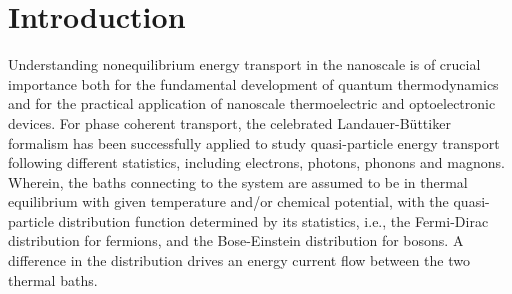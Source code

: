\documentclass[aps,prb,
,floatfix,footinbib,shortbibliography,
preprint
]{revtex4-1}
\begin{document}
\maketitle


\section{Introduction}
Understanding nonequilibrium energy transport in the nanoscale is of crucial importance both for the fundamental development of quantum thermodynamics and for the practical application of nanoscale thermoelectric and optoelectronic devices. For phase coherent transport, the celebrated Landauer-B\"uttiker formalism has been successfully applied to study quasi-particle energy transport following different statistics, including electrons\cite{imry1999conductance}, photons\cite{ojanen2008mesoscopic,biehs2010mesoscopic,zhang2018energy,benabdallah2014near}, phonons\cite{rego1998quantized,mingo2005carbon,yamamoto2006nonequilibrium,wang2006nonequilibrium,wang2007nonequilibrium,wang2008quantum,ruokola2009thermal,li2012colloquium,taylor2015quantum,wang2016landauer} and magnons\cite{wang2004spin}.
Wherein, the baths connecting to the system are assumed to be in thermal equilibrium with given temperature and/or chemical potential, with the quasi-particle distribution function  determined by its statistics, i.e., the Fermi-Dirac distribution for fermions, and the Bose-Einstein distribution for bosons. A difference in the distribution drives an energy current flow between the two thermal baths. 

\end{document}
